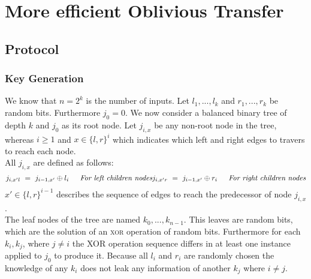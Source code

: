 \documentclass{report}
\begin{document}
	\section{More efficient Oblivious Transfer}
	\startsection
		\subsection{Protocol}
		\startsubsection
			\subsubsection{Key Generation}
			\startsubsection
				We know that $n = 2^k$ is the number of inputs. Let $l_1, ..., l_k$ and $r_1,...,r_k$ be random bits. Furthermore $j_0 = 0$. We now consider a balanced binary tree of depth $k$ and $j_0$ as its root node. Let $j_{i,x}$ be any non-root node in the tree, whereas $i \geq 1$ and $x \in \{l, r \}^i$ which indicates which left and right edges to travers to reach each node. \\
				All $j_{i,x}$ are defined as follows:
				\[
					j_{i, x'l} \ = \ j_{i - 1, x'} \oplus l_i \indent \textit{For left children nodes} $$$$
					j_{i, x'r} \ = \ j_{i - 1, x'} \oplus r_i \indent \textit{For right children nodes}
				\]
				$x' \in \{l, r \} ^{i-1}$ describes the sequence of edges to reach the predecessor of node $j_{i,x}$. \\
				The leaf nodes of the tree are named $k_0,...,k_{n-1}$. This leaves are random bits, which are the solution of an \textsc{xor} operation of random bits. Furthermore for each $k_i, k_j$, where $j \neq i$ the XOR operation sequence differs in at least one instance applied to $j_0$ to produce it. Because all $l_i$ and $r_i$ are randomly chosen the knowledge of any $k_i$ does not leak any information of another $k_j$ where $i \neq j$.
			\closesection
\end{document}
